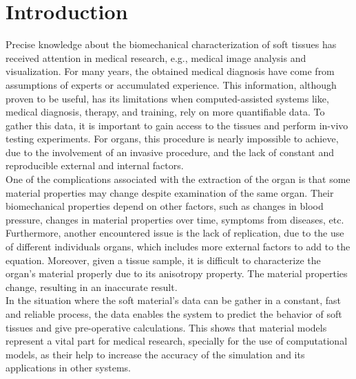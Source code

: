 
\chapter{Introduction} %

\label{Chapter2} %

Precise knowledge about the biomechanical characterization of soft tissues has received attention
in medical research, e.g., medical image analysis and visualization.
For many years, the obtained medical diagnosis have come from assumptions of experts or 
accumulated experience. This information, although proven to be useful, has its limitations 
when computed-assisted systems like, medical diagnosis, therapy, and training, rely on 
more quantifiable data\cite{Kauer2002}. To gather this data, it is important to gain access
to the tissues and perform in-vivo testing experiments. For organs, this procedure is nearly 
impossible to achieve, due to the involvement of an invasive procedure, and the lack of constant
and reproducible external and internal factors. \\ 

One of the complications associated with the extraction of the organ is that some material 
properties may change despite examination of the same organ. Their biomechanical properties 
depend on other factors, such as changes in blood pressure, changes in material properties 
over time, symptoms from diseases, etc. Furthermore, another encountered issue is the lack 
of replication, due to the use of different individuals organs, which includes more external
 factors to add to the equation. Moreover, given a tissue sample, it is difficult to 
 characterize the organ's material properly due to its anisotropy property. The material 
 properties change, resulting in an inaccurate result.
\\

In the situation where the soft material's data can be gather in a constant, fast and reliable
process, the data enables the system to predict the behavior of soft tissues and give pre-operative
 calculations. This shows that material models represent a vital part for medical research, 
 specially for the use of computational models, as their help to increase the accuracy of the 
 simulation and its applications in other systems. 

